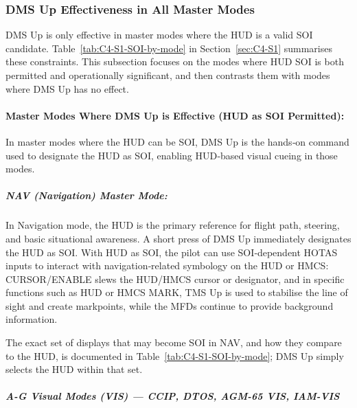 \documentclass[11pt,a4paper]{article}
\begin{document}
\subsubsection{DMS Up Effectiveness in All Master Modes}
\label{sec:C4-S2-S1}

DMS Up is only effective in master modes where the HUD is a valid SOI candidate. Table~\ref{tab:C4-S1-SOI-by-mode} in Section~\ref{sec:C4-S1} summarises these constraints. This subsection focuses on the modes where HUD SOI is both permitted and operationally significant, and then contrasts them with modes where DMS Up has no effect.

\paragraph*{Master Modes Where DMS Up is Effective (HUD as SOI Permitted):}

In master modes where the HUD can be SOI, DMS Up is the hands‑on command used to designate the HUD as SOI, enabling HUD‑based visual cueing in those modes.

\subparagraph*{NAV (Navigation) Master Mode:}


In Navigation mode, the HUD is the primary reference for flight path, steering, and basic situational awareness. A short press of DMS Up immediately designates the HUD as SOI. With HUD as SOI, the pilot can use SOI‑dependent HOTAS inputs to interact with navigation‑related symbology on the HUD or HMCS: CURSOR/ENABLE slews the HUD/HMCS cursor or designator, and in specific functions such as HUD or HMCS MARK, TMS Up is used to stabilise the line of sight and create markpoints, while the MFDs continue to provide background information.

The exact set of displays that may become SOI in NAV, and how they compare to the HUD, is documented in Table~\ref{tab:C4-S1-SOI-by-mode}; DMS Up simply selects the HUD within that set.

\subparagraph*{A-G Visual Modes (VIS) --- CCIP, DTOS, AGM-65 VIS, IAM-VIS}

\end{document}
